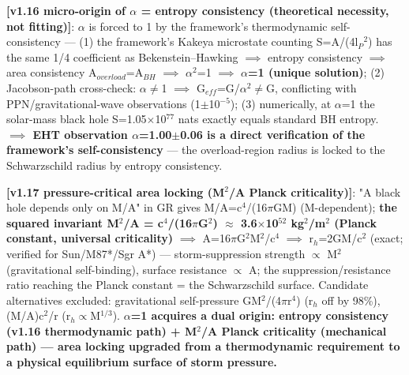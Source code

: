 \documentclass[12pt]{article}
\newcommand{\mtag}[1]{\textbf{[#1]}}
\newcommand{\up}[1]{\ensuremath{^{#1}}}
\newcommand{\down}[1]{\ensuremath{_{#1}}}
\begin{document}
\textbf{\mtag{v1.16 micro-origin of \ensuremath{\alpha} = entropy consistency (theoretical necessity, not fitting)}}: \ensuremath{\alpha} is forced to 1 by the framework's thermodynamic self-consistency --- (1) the framework's Kakeya microstate counting S=A/(4l\down{P}\up{2}) has the same 1/4 coefficient as Bekenstein--Hawking \ensuremath{\implies} entropy consistency \ensuremath{\implies} area consistency A\down{overload}=A\down{BH} \ensuremath{\implies} \ensuremath{\alpha}\up{2}=1 \ensuremath{\implies} \textbf{\ensuremath{\alpha}=1 (unique solution)}; (2) Jacobson-path cross-check: \ensuremath{\alpha}\ensuremath{\neq}1 \ensuremath{\implies} G\down{eff}=G/\ensuremath{\alpha}\up{2}\ensuremath{\neq}G, conflicting with PPN/gravitational-wave observations (1\ensuremath{\pm}10\up{-5}); (3) numerically, at \ensuremath{\alpha}=1 the solar-mass black hole S=1.05\ensuremath{\times}10\up{77} nats exactly equals standard BH entropy. \textbf{\ensuremath{\implies} EHT observation \ensuremath{\alpha}=1.00\ensuremath{\pm}0.06 is a direct verification of the framework's self-consistency} --- the overload-region radius is locked to the Schwarzschild radius by entropy consistency.

\textbf{\mtag{v1.17 pressure-critical area locking (M\up{2}/A Planck criticality)}}: "A black hole depends only on M/A" in GR gives M/A=c\up{4}/(16\ensuremath{\pi}GM) (M-dependent); \textbf{the squared invariant M\up{2}/A = c\up{4}/(16\ensuremath{\pi}G\up{2}) \ensuremath{\approx} 3.6\ensuremath{\times}10\up{52} kg\up{2}/m\up{2} (Planck constant, universal criticality)} \ensuremath{\implies} A=16\ensuremath{\pi}G\up{2}M\up{2}/c\up{4} \ensuremath{\implies} r\down{h}=2GM/c\up{2} (exact; verified for Sun/M87*/Sgr A*) --- storm-suppression strength \ensuremath{\propto} M\up{2} (gravitational self-binding), surface resistance \ensuremath{\propto} A; the suppression/resistance ratio reaching the Planck constant = the Schwarzschild surface. Candidate alternatives excluded: gravitational self-pressure GM\up{2}/(4\ensuremath{\pi}r\up{4}) (r\down{h} off by 98\%), (M/A)c\up{2}/r (r\down{h}\ensuremath{\propto}M\up{1/3}). \textbf{\ensuremath{\alpha}=1 acquires a dual origin: entropy consistency (v1.16 thermodynamic path) + M\up{2}/A Planck criticality (mechanical path) --- area locking upgraded from a thermodynamic requirement to a physical equilibrium surface of storm pressure.}
\end{document}

